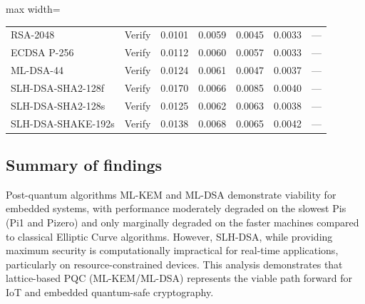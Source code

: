 \documentclass[11pt, letterpaper]{article}
\begin{document}
\begin{table}[H]
\begin{adjustbox}{max width=\textwidth}
\begin{tabular}{llccccc}
RSA-2048 & Verify & 0.0101 & 0.0059 & 0.0045 & 0.0033 & --- \\
ECDSA P-256 & Verify & 0.0112 & 0.0060 & 0.0057 & 0.0033 & --- \\
ML-DSA-44 & Verify & 0.0124 & 0.0061 & 0.0047 & 0.0037 & --- \\
SLH-DSA-SHA2-128f & Verify & 0.0170 & 0.0066 & 0.0085 & 0.0040 & --- \\
SLH-DSA-SHA2-128s & Verify & 0.0125 & 0.0062 & 0.0063 & 0.0038 & --- \\
SLH-DSA-SHAKE-192s & Verify & 0.0138 & 0.0068 & 0.0065 & 0.0042 & --- \\

\hline
\end{tabular}
\end{adjustbox}
\end{table}

\subsection{Summary of findings}

Post-quantum algorithms ML-KEM and ML-DSA demonstrate viability for embedded systems, with performance moderately degraded on the slowest Pis (Pi1 and Pizero) and only marginally degraded on the faster machines compared to classical Elliptic Curve algorithms. However, SLH-DSA, while providing maximum security is computationally impractical for real-time applications, particularly on resource-constrained devices. This analysis demonstrates that lattice-based PQC (ML-KEM/ML-DSA) represents the viable path forward for IoT and embedded quantum-safe cryptography.
\end{document}
